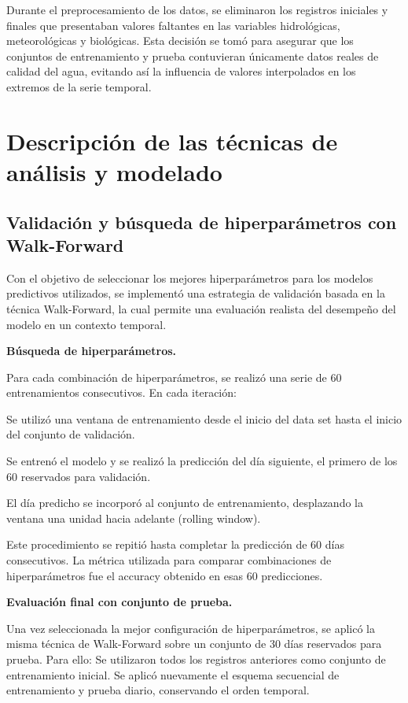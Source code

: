 \documentclass[
  11pt,
  pdftitle=TFI - Tschopp Joaquín S.,
  pdfauthor=Tschopp Joaquín S.,
  pdfcreator=LaTeX with hyperref,
]{report}  %
\begin{document}
Durante el preprocesamiento de los datos, se eliminaron los registros iniciales y finales que presentaban valores faltantes en las variables hidrológicas, meteorológicas y biológicas. Esta decisión se tomó para asegurar que los conjuntos de entrenamiento y prueba contuvieran únicamente datos reales de calidad del agua, evitando así la influencia de valores interpolados en los extremos de la serie temporal.



\section{Descripción de las técnicas de análisis y modelado}

\subsection{Validación y búsqueda de hiperparámetros con Walk-Forward}

Con el objetivo de seleccionar los mejores hiperparámetros para los modelos predictivos utilizados, se implementó una estrategia de validación basada en la técnica Walk-Forward, la cual permite una evaluación realista del desempeño del modelo en un contexto temporal.

\textbf{Búsqueda de hiperparámetros.}

Para cada combinación de hiperparámetros, se realizó una serie de 60 entrenamientos consecutivos. En cada iteración:

Se utilizó una ventana de entrenamiento desde el inicio del data set hasta el inicio del conjunto de validación.

Se entrenó el modelo y se realizó la predicción del día siguiente, el primero de los 60 reservados para validación.

El día predicho se incorporó al conjunto de entrenamiento, desplazando la ventana una unidad hacia adelante (rolling window).

Este procedimiento se repitió hasta completar la predicción de 60 días consecutivos. La métrica utilizada para comparar combinaciones de hiperparámetros fue el accuracy obtenido en esas 60 predicciones.

\textbf{Evaluación final con conjunto de prueba.}

Una vez seleccionada la mejor configuración de hiperparámetros, se aplicó la misma técnica de Walk-Forward sobre un conjunto de 30 días reservados para prueba. 
Para ello:
Se utilizaron todos los registros anteriores como conjunto de entrenamiento inicial.
Se aplicó nuevamente el esquema secuencial de entrenamiento y prueba diario, conservando el orden temporal.
\end{document}
